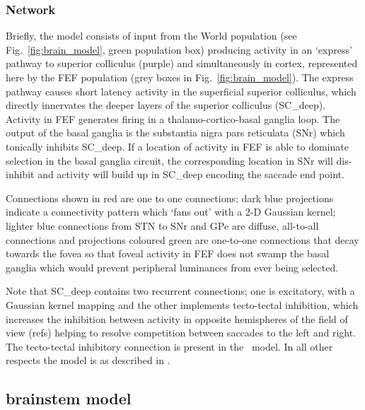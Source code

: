 \documentclass{frontiersSCNS}
\begin{document}
\subsubsection{Network}

Briefly, the model consists of input from the World population (see
Fig.~\ref{fig:brain_model}, green population box) producing activity
in an `express' pathway to superior colliculus (purple) and
simultaneously in cortex, represented here by the FEF population (grey
boxes in Fig.~\ref{fig:brain_model}). The express pathway causes short
latency activity in the superficial superior colliculus, which
directly innervates the deeper layers of the superior colliculus
(SC\_deep). Activity in FEF generates firing in a
thalamo-cortico-basal ganglia loop. The output of the basal ganglia is
the substantia nigra pars reticulata (SNr) which tonically inhibits
SC\_deep. If a location of activity in FEF is able to dominate
selection in the basal ganglia circuit, the corresponding location in
SNr will dis-inhibit and activity will build up in SC\_deep encoding
the saccade end point.

Connections shown in red are one to one connections; dark blue
projections indicate a connectivity pattern which `fans out' with a
2-D Gaussian kernel; lighter blue connections from STN to SNr and GPe
are diffuse, all-to-all connections and projections coloured green are
one-to-one connections that decay towards the fovea so that foveal
activity in FEF does not swamp the basal ganglia which would prevent
peripheral luminances from ever being selected.

Note that SC\_deep contains two recurrent connections; one is
excitatory, with a Gaussian kernel mapping and the other implements
tecto-tectal inhibition, which increases the inhibition between
activity in opposite hemispheres of the field of view (refs) helping
to resolve competition between saccades to the left and right. The
tecto-tectal inhibitory connection is  present in
the \ccg~model. In all other respects the model is as described in 
\cite{cope_basal_2017}.


\subsection{brainstem model}
\end{document}
